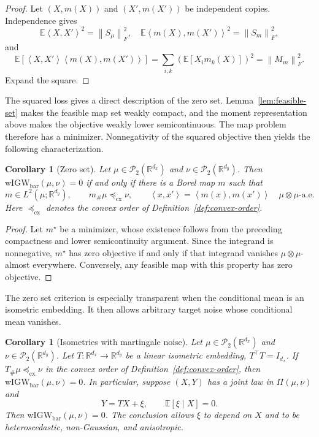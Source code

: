 \documentclass[11pt]{article}
\newcommand{\R}{\mathbb R}
\newcommand{\E}{\mathbb E}
\newcommand{\cP}{\mathcal P}
\newcommand{\ip}[2]{\left\langle #1,#2\right\rangle}
\newcommand{\norm}[1]{\left\lVert #1\right\rVert}
\newcommand{\cx}{\preceq_{\mathrm{cx}}}
\newcommand{\wIGW}{\mathrm{wIGW}_{\mathrm{bar}}}
\theoremstyle{plain}
\newtheorem{corollary}[theorem]{Corollary}
\theoremstyle{definition}
\theoremstyle{remark}
\begin{document}
\begin{proof}
Let \((X,m(X))\) and \((X',m(X'))\) be independent copies. Independence gives
\[
  \E\ip{X}{X'}^2=\norm{S_\mu}_F^2,
  \quad \E\ip{m(X)}{m(X')}^2=\norm{S_m}_F^2,
\]
and
\[
  \E[\ip{X}{X'}\ip{m(X)}{m(X')}]
  =\sum_{i,k}(\E[X_i m_k(X)])^2=\norm{M_m}_F^2.
\]
Expand the square.
\end{proof}

The squared loss gives a direct description of the zero set.
Lemma~\ref{lem:feasible-set} makes the feasible map set weakly compact, and the
moment representation above makes the objective weakly lower semicontinuous.
The map problem therefore has a minimizer. Nonnegativity of the squared objective
then yields the following characterization.

\begin{corollary}[Zero set]\label{cor:zero}
Let $\mu\in\cP_2(\R^{d_x})$ and $\nu\in\cP_2(\R^{d_y})$. Then
\(\wIGW(\mu,\nu)=0\) if and only if there is a Borel map \(m\) such that
\[
  m\in L^2(\mu;\R^{d_y}),
  \qquad
  m_\#\mu\cx\nu,
  \qquad \ip{x}{x'}=\ip{m(x)}{m(x')}
  \quad \mu\otimes\mu\text{-a.e.}
\]
Here $\cx$ denotes the convex order of Definition~\ref{def:convex-order}.
\end{corollary}

\begin{proof}
Let $m^\star$ be a minimizer, whose existence follows from the preceding
compactness and lower semicontinuity argument. Since the integrand is
nonnegative, $m^\star$ has zero objective if and only if that integrand vanishes
$\mu\otimes\mu$-almost everywhere. Conversely, any feasible map with this
property has zero objective.
\end{proof}

The zero set criterion is especially transparent when the conditional mean is an
isometric embedding. It then allows arbitrary target noise whose conditional mean
vanishes.

\begin{corollary}[Isometries with martingale noise]\label{cor:noisy-isometry}
Let $\mu\in\cP_2(\R^{d_x})$ and $\nu\in\cP_2(\R^{d_y})$.
Let \(T:\R^{d_x}\to\R^{d_y}\) be a linear isometric embedding,
\(T^\top T=I_{d_x}\). If $T_\#\mu\cx\nu$ in the convex order of
Definition~\ref{def:convex-order}, then \(\wIGW(\mu,\nu)=0\). In particular,
suppose $(X,Y)$ has a joint law in $\Pi(\mu,\nu)$ and
\[
  Y=TX+\xi,
  \qquad \E[\xi\mid X]=0.
\]
Then \(\wIGW(\mu,\nu)=0\). The conclusion allows $\xi$ to depend on $X$ and to
be heteroscedastic, non-Gaussian, and anisotropic.
\end{corollary}
\end{document}
